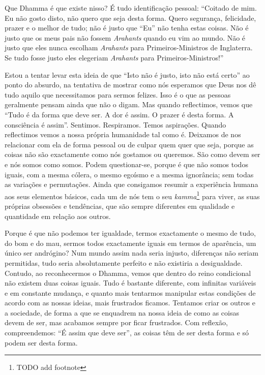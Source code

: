 Que Dhamma é que existe nisso? É tudo identificação pessoal: “Coitado de mim. Eu
não gosto disto, não quero que seja desta forma. Quero segurança, felicidade,
prazer e o melhor de tudo; não é justo que “Eu” não tenha estas coisas. Não é
justo que os meus pais não fossem \emph{Arahants} quando eu vim ao mundo. Não é
justo que eles nunca escolham \emph{Arahants} para Primeiros-Ministros de
Inglaterra. Se tudo fosse justo eles elegeriam \emph{Arahants} para
Primeiros-Ministros!”

Estou a tentar levar esta ideia de que “Isto não é justo, isto não está certo”
ao ponto do absurdo, na tentativa de mostrar como nós esperamos que Deus nos dê
tudo aquilo que necessitamos para sermos felizes. Isso é o que as pessoas
geralmente pensam ainda que não o digam. Mas quando reflectimos, vemos que “Tudo
é da forma que deve ser. A dor é assim. O prazer é desta forma. A consciência é
assim”. Sentimos. Respiramos. Temos aspirações. Quando reflectimos vemos a nossa
própria humanidade tal como é. Deixamos de nos relacionar com ela de forma
pessoal ou de culpar quem quer que seja, porque as coisas não são exactamente
como nós gostamos ou queremos. São como devem ser e nós somos como somos. Podem
questionar-se, porque é que não somos todos iguais, com a mesma cólera, o mesmo
egoísmo e a mesma ignorância; sem todas as variações e permutações. Ainda que
consigamos resumir a experiência humana aos seus elementos básicos, cada um de
nós tem o seu \emph{kamma}\footnote{TODO add footnote} para viver, as suas
próprias obsessões e tendências, que são sempre diferentes em qualidade e
quantidade em relação aos outros.

Porque é que não podemos ter igualdade, termos exactamente o mesmo de tudo, do
bom e do mau, sermos todos exactamente iguais em termos de aparência, um único
ser andrógino? Num mundo assim nada seria injusto, diferenças não seriam
permitidas, tudo seria absolutamente perfeito e não existiria a desigualdade.
Contudo, ao reconhecermos o Dhamma, vemos que dentro do reino condicional não
existem duas coisas iguais. Tudo é bastante diferente, com infinitas variáveis e
em constante mudança, e quanto mais tentarmos manipular estas condições de
acordo com as nossas ideias, mais frustrados ficamos. Tentamos criar os outros e
a sociedade, de forma a que se enquadrem na nossa ideia de como as coisas devem
de ser, mas acabamos sempre por ficar frustrados. Com reflexão, compreendemos:
“É assim que deve ser”, as coisas têm de ser desta forma e só podem ser desta
forma.

